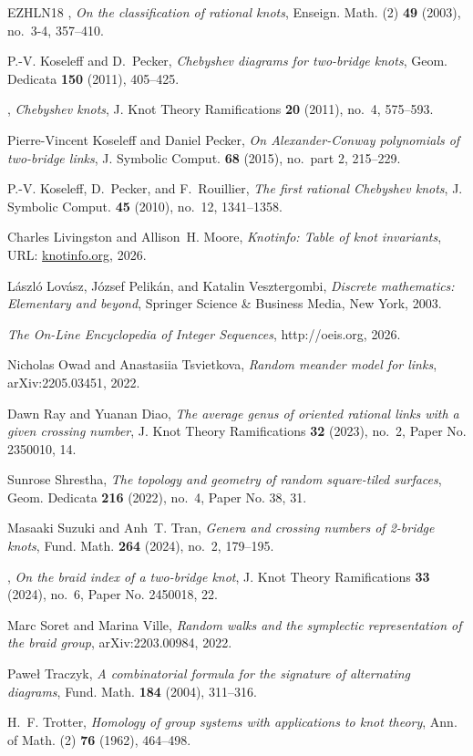 \documentclass[11pt]{amsart}
\theoremstyle{definition}
\theoremstyle{remark}
\numberwithin{equation}{section}
\begin{document}
\begin{thebibliography}{EZHLN18}
\bysame, \emph{On the classification of rational knots}, Enseign. Math. (2)
  \textbf{49} (2003), no.~3-4, 357--410.

P.-V. Koseleff and D.~Pecker, \emph{Chebyshev diagrams for two-bridge knots},
  Geom. Dedicata \textbf{150} (2011), 405--425.

\bysame, \emph{Chebyshev knots}, J. Knot Theory Ramifications \textbf{20}
  (2011), no.~4, 575--593.

Pierre-Vincent Koseleff and Daniel Pecker, \emph{On {A}lexander-{C}onway
  polynomials of two-bridge links}, J. Symbolic Comput. \textbf{68} (2015),
  no.~part 2, 215--229. 

P.-V. Koseleff, D.~Pecker, and F.~Rouillier, \emph{The first rational
  {C}hebyshev knots}, J. Symbolic Comput. \textbf{45} (2010), no.~12,
  1341--1358.

Charles Livingston and Allison~H. Moore, \emph{Knotinfo: Table of knot
  invariants}, URL: \url{knotinfo.org}, 2026.

L{\'a}szl{\'o} Lov{\'a}sz, J{\'o}zsef Pelik{\'a}n, and Katalin Vesztergombi,
  \emph{Discrete mathematics: Elementary and beyond}, Springer Science \&
  Business Media, New York, 2003.

\emph{The {O}n-{L}ine {E}ncyclopedia of {I}nteger {S}equences},
  http://oeis.org, 2026.

Nicholas Owad and Anastasiia Tsvietkova, \emph{Random meander model for links},
  arXiv:2205.03451, 2022.

Dawn Ray and Yuanan Diao, \emph{The average genus of oriented rational links
  with a given crossing number}, J. Knot Theory Ramifications \textbf{32}
  (2023), no.~2, Paper No. 2350010, 14.

Sunrose Shrestha, \emph{The topology and geometry of random square-tiled
  surfaces}, Geom. Dedicata \textbf{216} (2022), no.~4, Paper No. 38, 31.

Masaaki Suzuki and Anh~T. Tran, \emph{Genera and crossing numbers of 2-bridge
  knots}, Fund. Math. \textbf{264} (2024), no.~2, 179--195.

\bysame, \emph{On the braid index of a two-bridge knot}, J. Knot Theory
  Ramifications \textbf{33} (2024), no.~6, Paper No. 2450018, 22.

Marc Soret and Marina Ville, \emph{Random walks and the symplectic
  representation of the braid group}, arXiv:2203.00984, 2022.

Pawe{\l} Traczyk, \emph{A combinatorial formula for the signature of
  alternating diagrams}, Fund. Math. \textbf{184} (2004), 311--316.

H.~F. Trotter, \emph{Homology of group systems with applications to knot
  theory}, Ann. of Math. (2) \textbf{76} (1962), 464--498.

\end{thebibliography}
\end{document}
